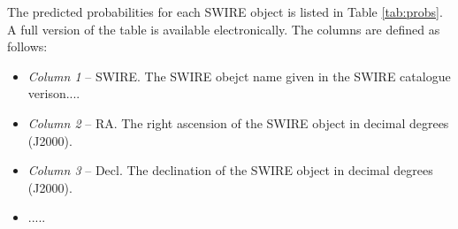 \documentclass[fleqn,usenatbib,usedcolumn]{mnras}
\begin{document}
  The predicted probabilities for each SWIRE object is listed in Table \ref{tab:probs}. A full version of the table is available electronically.  The columns are defined as follows:
 \begin{itemize}
\item {\em Column 1}  -- SWIRE. The SWIRE obejct name given in the SWIRE catalogue verison....
\item {\em Column 2} -- RA. The right ascension of the SWIRE object in decimal degrees (J2000).
\item {\em Column 3} -- Decl. The declination of the SWIRE object in decimal degrees (J2000).
\item .....
\end{itemize}
  
\bsp	%
\label{lastpage}
\end{document}
